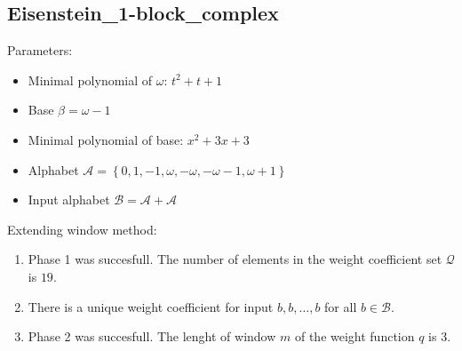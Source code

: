 \subsection{ Eisenstein\_1-block\_complex }

\label{subsec:Eisenstein1-blockcomplex}

Parameters:
\begin{itemize}
    \item Minimal polynomial of $\omega$: $ t^{2} + t + 1 $
    \item Base $\beta= \omega - 1 $
    \item Minimal polynomial of base: $ x^{2} + 3x + 3 $
    \item Alphabet $\mathcal{A} =\left\{0, 1, -1, \omega, -\omega, -\omega - 1, \omega + 1\right\}$
    \item Input alphabet $\mathcal{B} =\mathcal{A}+ \mathcal{A}$
\end{itemize}

\noindent Extending window method:
\begin{enumerate}
    \item Phase 1 was succesfull.
The number of elements in the weight coefficient set $\mathcal{Q}$ is $19$.

    \item There is a unique weight coefficient for input $b,b,\dots,b$ for all $b\in\mathcal{B}$.

    \item Phase 2 was succesfull.
The lenght of window $m$ of the weight function $q$ is 3.
\end{enumerate}
